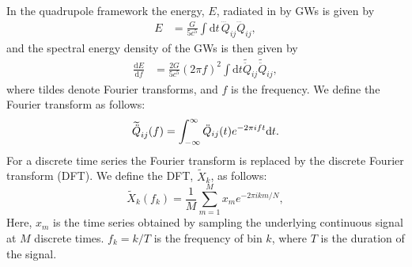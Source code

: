 In the quadrupole framework the energy, $E$, radiated in by GWs is given by 
\begin{align}
E &=\frac{G}{5 c^5} \int \mathrm{d}t \, \dddot{Q}_{ij} \dddot{Q}_{ij},
\end{align}
and the spectral energy density of the GWs is then given by 
\begin{align}
\frac{\mathrm{d} E}{\mathrm{d} f} &= \frac{2G}{5 c^5} (2\pi f)^2 \int \mathrm{d}t \widetilde{\ddot{Q}}_{ij} \widetilde{\ddot{Q}}_{ij},
\end{align}
where tildes denote Fourier transforms, and $f$ is the
frequency. We define the Fourier transform as follows:
\begin{equation}
\widetilde{\ddot{Q}}_{ij}(f) = \int_{-\infty}^{\infty} \ddot{Q}_{ij}(t) e^{-2 \pi i f t} \mathrm{d} t. 
\end{equation}
For a discrete time series the Fourier transform is replaced by the discrete Fourier transform (DFT).
We define the DFT, $\widetilde{X}_k$, as follows: 
\begin{equation} \label{eq:DFT}
\widetilde{X}_k (f_k) = \frac{1}{M}  \sum^M_{m=1} x_m e^{-2\pi i k m/N},
\end{equation}
Here, $x_m$ is the time series obtained by sampling the underlying continuous signal at $M$ discrete times. 
$f_k = k/T$ is the frequency of bin $k$, where $T$ is the duration of the signal.
